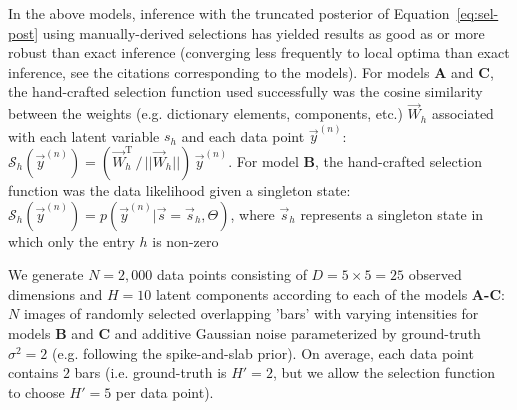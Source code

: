 In the above models, inference with the truncated posterior of Equation~\eqref{eq:sel-post} using manually-derived selections has yielded results as good as or more robust than exact inference (converging less frequently to local optima than exact inference, see the citations corresponding to the models).
For models \textbf{A} and \textbf{C}, the hand-crafted selection function used successfully was the cosine similarity between the weights (e.g. dictionary elements, components, etc.) $\vec{W}_h$ associated with each latent variable $s_h$ and 
each data point $\vec{y}^{(n)}$: 
$  \mathcal{S}_h(\vec{y}^{(n)}) = (\vec{W}_{h}^{\mathrm{T}}\,/\,||\vec{W}_{h}||)\,\vec{y}^{(n)}$.
For model \textbf{B}, the hand-crafted selection function was the data likelihood given a singleton state:
 $\mathcal{S}_h(\vec{y}^{(n)}) = p(\vec{y}^{(n)} | \vec{s}=\vec{s}_h, \Theta)$, 
%
where $\vec{s}_h$ represents a singleton state in which only the entry $h$ is non-zero

We generate $N=2,000$ data points consisting of $D=5\times5=25$ observed dimensions and $H=10$ latent components according to each of the models \textbf{A-C}:
$N$ images of randomly selected overlapping 'bars' with varying intensities for models \textbf{B} and \textbf{C} and additive Gaussian noise parameterized by ground-truth $\sigma^2 = 2$ (e.g. following the spike-and-slab prior).
On average, each data point contains $2$ bars (i.e. ground-truth is $H'=2$, but we allow the selection function to choose $H'=5$ per data point).


